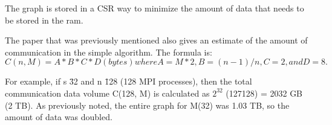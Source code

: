 The graph is stored in a CSR way to minimize the amount of data that needs to be stored in the ram.

The paper that was previously mentioned also gives an estimate of the amount of communication in the simple algorithm. The formula is:\\
\begin{math}
C(n, M) = A * B * C * D (bytes)  where A = M*2, B = (n-1)/n, C=2, and D=8.  
\end{math}

For example, if s \= 32 and n \= 128 (128 MPI processes), then the total communication 
data volume C(128, M) is calculated as $2^{32}$   \* (127\/128)   = 2032 GB (2 TB). As previously noted, the entire graph for M(32) was 
1.03 TB, so the amount of data was doubled.